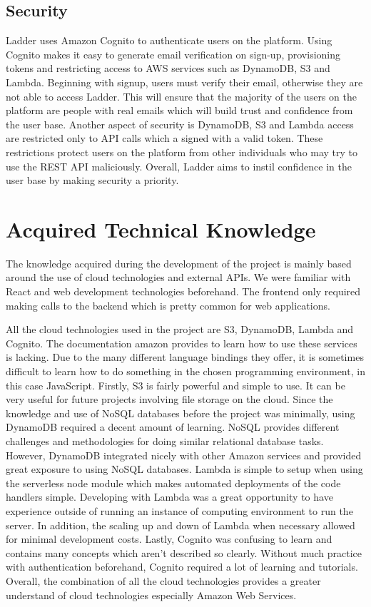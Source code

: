\documentclass[conference]{IEEEtran}
\begin{document}
\subsection{Security}
Ladder uses Amazon Cognito to authenticate users on the platform. Using Cognito makes it easy to generate email verification on sign-up,  provisioning tokens and restricting access to AWS services such as DynamoDB, S3 and Lambda. Beginning with signup, users must verify their email, otherwise they are not able to access Ladder. This will ensure that the majority of the users on the platform are people with real emails which will build trust and confidence from the user base. Another aspect of security is DynamoDB, S3 and Lambda access are restricted only to API calls which a signed with a valid token. These restrictions protect users on the platform from other individuals who may try to use the REST API maliciously. Overall, Ladder aims to instil confidence in the user base by making security a priority.

\section{Acquired Technical Knowledge}
The knowledge acquired during the development of the project is mainly based around the use of cloud technologies and external APIs. We were familiar with React and web development technologies beforehand. The frontend only required making calls to the backend which is pretty common for web applications.

All the cloud technologies used in the project are S3, DynamoDB, Lambda and Cognito. The documentation amazon provides to learn how to use these services is lacking. Due to the many different language bindings they offer, it is sometimes difficult to learn how to do something in the chosen programming environment, in this case JavaScript. Firstly, S3 is fairly powerful and simple to use. It can be very useful for future projects involving file storage on the cloud. Since the knowledge and use of NoSQL databases before the project was minimally, using DynamoDB required a decent amount of learning. NoSQL provides different challenges and methodologies for doing similar relational database tasks. However, DynamoDB integrated nicely with other Amazon services and provided great exposure to using NoSQL databases. Lambda is simple to setup when using the serverless node module which makes automated deployments of the code handlers simple. Developing with Lambda was a great opportunity to have experience outside of running an instance of computing environment to run the server. In addition, the scaling up and down of Lambda when necessary allowed for minimal development costs. Lastly, Cognito was confusing to learn and contains many concepts which aren't described so clearly. Without much practice with authentication beforehand, Cognito required a lot of learning and tutorials. Overall, the combination of all the cloud technologies provides a greater understand of cloud technologies especially Amazon Web Services.
\end{document}
